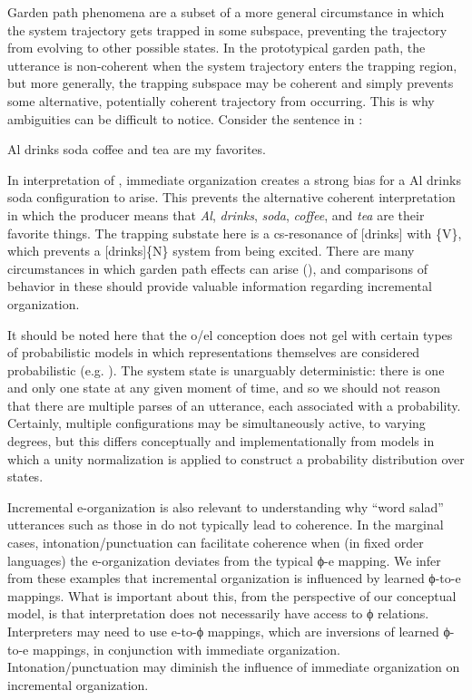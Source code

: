   Garden path phenomena are a subset of a more general circumstance in which the system trajectory gets trapped in some subspace, preventing the trajectory from evolving to other possible states. In the prototypical garden path, the utterance is non-coherent when the system trajectory enters the trapping region, but more generally, the trapping subspace may be coherent and simply prevents some alternative, potentially coherent trajectory from occurring. This is why ambiguities can be difficult to notice. Consider the sentence in :

  \ea\label{ex:6:13}
    {Al drinks soda coffee and tea are my favorites.}
   \z
   
  In interpretation of , immediate organization creates a strong bias for a {\textbar}Al drinks soda{\textbar} configuration to arise. This prevents the alternative coherent interpretation in which the producer means that \textit{Al}, \textit{drinks}, \textit{soda}, \textit{coffee}, and \textit{tea} are their favorite things. The trapping substate here is a cs-resonance of [drinks] with \{V\}, which prevents a [drinks]\{N\} system from being excited. There are many circumstances in which garden path effects can arise (\citealt{FFerreira2005,Pritchett1988}), and comparisons of behavior in these should provide valuable information regarding incremental organization. 

  It should be noted here that the o/el conception does not gel with certain types of probabilistic models in which representations themselves are considered probabilistic (e.g. \citealt{ChaterManning2006,Manning2003}). The system state is unarguably deterministic: there is one and only one state at any given moment of time, and so we should not reason that there are multiple parses of an utterance, each associated with a probability. Certainly, multiple configurations may be simultaneously active, to varying degrees, but this differs conceptually and implementationally from models in which a unity normalization is applied to construct a probability distribution over states.

  Incremental e-organization is also relevant to understanding why “word salad” utterances such as those in  do not typically lead to coherence. In the marginal cases, intonation/punctuation can facilitate coherence when (in fixed order languages) the e-organization deviates from the typical ϕ-e mapping. We infer from these examples that incremental organization is influenced by learned ϕ-to-e mappings. What is important about this, from the perspective of our conceptual model, is that interpretation does not necessarily have access to ϕ relations. Interpreters may need to use e-to-ϕ mappings, which are inversions of learned ϕ-to-e mappings, in conjunction with immediate organization. Intonation/punctuation may diminish the influence of immediate organization on incremental organization. 

